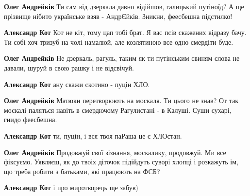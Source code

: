 \begin{itemize}
\begin{itemize}

\textbf{Олег Андрейків} Ти сам від дзеркала давно відійшов, галицький путіноїд?
А ще прізвище нібито українське взяв - АндрЄйків. Зникни, феесбешна підстилко!


\textbf{Александр Кот} Кот не кіт, тому цап тобі брат. Я вас псів скажених відразу бачу. Ти собі хоч тризуб на чолі намалюй, але козлятиною все одно смердіти буде. 🤣🤣🤣


\textbf{Олег Андрейків} Не дзеркаль, рагуль, таким як ти путінським свиням слова не давали, шуруй в свою рашку і не відсвічуй.


\textbf{Александр Кот} ану скажи скотино - пуцін ХЛО. 🤣


\textbf{Олег Андрейків} Матюки перетворюють на москаля. Ти цього не знав? От так москалі паляться навіть в смердючому Рагулистані - в Калуші. Суши сухарі, гнидо феесбешна.


\textbf{Александр Кот} ти, пуцін, і вся твоя паРаша це є ХЛОстан.


\textbf{Олег Андрейків} Продовжуй свої зізнання, москалику, продовжуй. Ми все фіксуємо. Уявляєш, як до твоіх діточок підійдуть суворі хлопці і розкажуть ім, що треба робити з батьками, які працюють на ФСБ?


\textbf{Александр Кот} і про миротворець ще забув)


\end{itemize}
\end{itemize}
